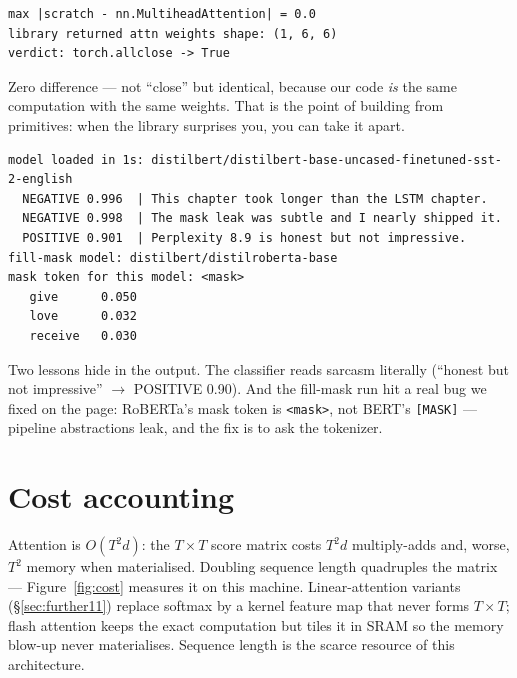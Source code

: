 

\begin{example}[Scratch $=$ library, exactly]
\label{ex:agreement}
\end{example}
\begin{verbatim}
max |scratch - nn.MultiheadAttention| = 0.0
library returned attn weights shape: (1, 6, 6)
verdict: torch.allclose -> True
\end{verbatim}
Zero difference --- not ``close'' but identical, because our code
\emph{is} the same computation with the same weights. That is the
point of building from primitives: when the library surprises you,
you can take it apart.



{\footnotesize\begin{verbatim}
model loaded in 1s: distilbert/distilbert-base-uncased-finetuned-sst-2-english
  NEGATIVE 0.996  | This chapter took longer than the LSTM chapter.
  NEGATIVE 0.998  | The mask leak was subtle and I nearly shipped it.
  POSITIVE 0.901  | Perplexity 8.9 is honest but not impressive.
fill-mask model: distilbert/distilroberta-base
mask token for this model: <mask>
   give      0.050
   love      0.032
   receive   0.030
\end{verbatim}}

Two lessons hide in the output. The classifier reads sarcasm
literally (``honest but not impressive'' $\to$ POSITIVE 0.90). And
the fill-mask run hit a real bug we fixed on the page: RoBERTa's
mask token is \texttt{<mask>}, not BERT's \texttt{[MASK]} ---
pipeline abstractions leak, and the fix is to ask the tokenizer.

\section{Cost accounting}
\label{sec:cost}

Attention is $O(T^2d)$: the $T\times T$ score matrix costs $T^2d$
multiply-adds and, worse, $T^2$ memory when materialised. Doubling
sequence length quadruples the matrix --- Figure~\ref{fig:cost}
measures it on this machine. Linear-attention variants
(\S\ref{sec:further11}) replace softmax by a kernel feature map that
never forms $T\times T$; flash attention keeps the exact computation
but tiles it in SRAM so the memory blow-up never materialises.
Sequence length is the scarce resource of this architecture.

